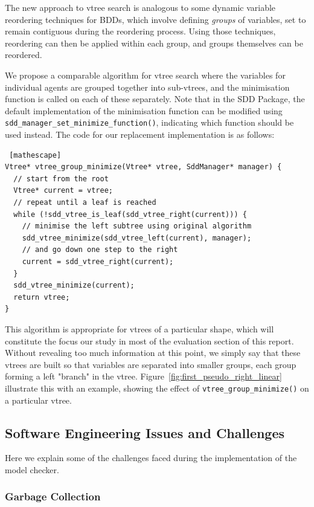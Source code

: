 \documentclass[11pt]{article}
\begin{document}
The new approach to vtree search is analogous to some dynamic variable reordering techniques for BDDs, which involve defining \textit{groups} of variables, set to remain contiguous during the reordering process. Using those techniques, reordering can then be applied within each group, and groups themselves can be reordered. 

We propose a comparable algorithm for vtree search where the variables for individual agents are grouped together into sub-vtrees, and the minimisation function is called on each of these separately. Note that in the SDD Package, the default implementation of the minimisation function can be modified using \texttt{sdd\_manager\_set\_minimize\_function()},  indicating which function should be used instead.
The code for our replacement implementation is as follows: 

\begin{lstlisting} [mathescape]
Vtree* vtree_group_minimize(Vtree* vtree, SddManager* manager) {
  // start from the root   
  Vtree* current = vtree; 
  // repeat until a leaf is reached
  while (!sdd_vtree_is_leaf(sdd_vtree_right(current))) {
    // minimise the left subtree using original algorithm
    sdd_vtree_minimize(sdd_vtree_left(current), manager);
    // and go down one step to the right
    current = sdd_vtree_right(current);	
  }
  sdd_vtree_minimize(current);
  return vtree;
} 
\end{lstlisting}

This algorithm is appropriate for vtrees of a particular shape, which will constitute the focus our study in most of the evaluation section of this report. Without revealing too much information at this point, we simply say
that these vtrees are built so that variables are separated into smaller groups, each group forming a left "branch" in the vtree. 
Figure~\ref{fig:first_pseudo_right_linear} illustrate this with an example, showing the effect of \texttt{vtree\_group\_minimize()} on a particular vtree.



\subsection{Software Engineering Issues and Challenges}

Here we explain some of the challenges faced during the implementation of the model checker. 

\subsubsection{Garbage Collection}
\end{document}
